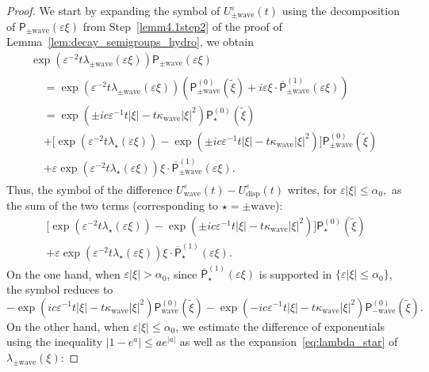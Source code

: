 \documentclass[AHL,Unicode,longabstracts,published]{cedram}
\newcommand{\Wave}{\mathrm{wave}}
\newcommand{\disp}{\mathrm{disp}}
\newcommand{\PP}{\mathsf{P}}
\renewcommand*\le{\leqslant}
\newcommand*\eps{{\varepsilon}}
\begin{document}
\begin{proof}
We start by expanding the symbol of $U^\eps_{\pm \Wave}(t)$ using the decomposition of $\PP_{\pm \Wave}(\eps \xi)$ from Step~\ref{lemm4.1step2} of the proof of Lemma~\ref{lem:decay_semigroups_hydro}, we obtain
\begin{multline*}
\exp\left(\eps^{-2} t \lambda_{\pm \Wave}(\eps \xi) \right)\PP_{\pm \Wave}(\eps \xi)\\
\begin{aligned}
&= \exp\left(\eps^{-2} t \lambda_{\pm \Wave}(\eps \xi) \right)\left(\PP_{\pm \Wave}^{(0)}\left(\widetilde{\xi} \right) + i\eps \xi \cdot \overline{\PP}^{(1)}_{\pm \Wave}(\eps \xi) \right)\\
&=  \exp\left(\pm i c \eps^{-1}t| \xi | - t \kappa_\Wave | \xi |^2 \right) \PP_{\star}^{(0)}\left(\widetilde{\xi} \right) \\
& + \Bigg[\exp\left(\eps^{-2} t \lambda_{\star}(\eps \xi) \right) - \exp\left(\pm i c \eps^{-1}t| \xi | - t \kappa_\Wave | \xi |^2 \right) \Bigg] \PP_{\pm \Wave}^{(0)}\left(\widetilde{\xi} \right) \\
& + \eps \exp\left(\eps^{-2} t \lambda_{\star}(\eps \xi) \right) \xi \cdot \overline{\PP}^{(1)}_{\pm \Wave}(\eps \xi).
\end{aligned}
\end{multline*}
Thus, the symbol of the difference $U^\eps_\Wave(t) - U^\eps_\disp(t)$ writes, for $\eps |\xi| \le \alpha_{0},$ as the sum of the two terms (corresponding to $\star=\pm\Wave$):
\begin{multline*}
\Big[\exp\left(\eps^{-2} t \lambda_{\star}(\eps \xi) \right) - \exp\left(\pm i c \eps^{-1}t | \xi | - t \kappa_\Wave | \xi |^2 \right) \Big] \PP_{\star}^{(0)}\left(\widetilde{\xi} \right)\\
+ \eps \exp\left(\eps^{-2} t \lambda_{\star}(\eps \xi) \right) \xi \cdot \overline{\PP}^{(1)}_{\star}(\eps \xi).
\end{multline*}
On the one hand, when $\eps |\xi| > \alpha_{0}$, since $\overline{\PP}^{(1)}_{\star}(\eps \xi)$ is supported in $\{ \eps |\xi | \le \alpha_{0} \}$, the symbol reduces to
\[
- \exp\left(i c \eps^{-1}t | \xi | - t \kappa_\Wave | \xi |^2 \right) \PP_\Wave^{(0)}\left(\widetilde{\xi} \right)-\exp\left(- i c \eps^{-1}t | \xi | - t \kappa_\Wave | \xi |^2 \right) \PP_{-\Wave}^{(0)}\left(\widetilde{\xi} \right).
\]
On the other hand, when $\eps | \xi | \le \alpha_{0}$, we estimate the difference of exponentials using the inequality $|1 - e^a| \le a e^{|a|}$ as well as the expansion~\eqref{eq:lambda_star} of $\lambda_{\pm\Wave}(\xi)$:

\end{proof}
\end{document}
